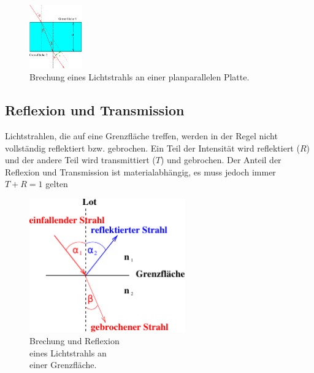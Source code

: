     \begin{figure}[H]
        \centering
        \includegraphics[width=0.2\textwidth]{build/Abb_5.pdf}
        \caption {Brechung eines Lichtstrahls an einer planparallelen Platte\cite[2]{V400}.}
        \label{fig:Abb_1}
    \end{figure}

\subsection{Reflexion und Transmission}
\label{subsec:R+T}
\begin{minipage}[t]{0,5\textwidth}
    Lichtstrahlen, die auf eine Grenzfläche treffen, werden in der Regel nicht vollständig reflektiert bzw. gebrochen.
    Ein Teil der Intensität wird reflektiert ($R$) und der andere Teil wird transmittiert ($T$) und gebrochen.
    Der Anteil der Reflexion und Transmission ist materialabhängig, es muss jedoch immer $T + R = 1$ gelten
\end{minipage} 
\begin{minipage}[t]{0,5\textwidth}
    \begin{figure}[H]
        \centering
        \includegraphics[width=0.6\textwidth]{build/Abb_2c.pdf}
        \caption {Brechung und Reflexion\\eines Lichtstrahls an\\einer Grenzfläche\cite[2]{V400}.}
        \label{fig:Abb_1}
    \end{figure}

\end{minipage}   
